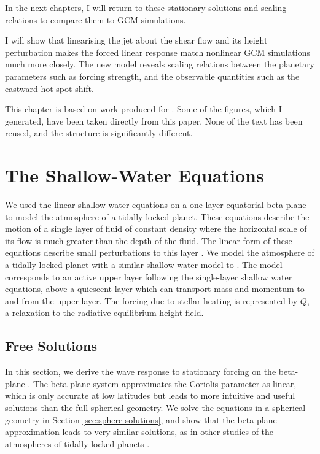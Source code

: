 In the next chapters, I will return to these stationary solutions and scaling relations  to compare them to GCM simulations.



I will show that linearising the jet about the shear flow and its height perturbation makes the forced linear response match nonlinear GCM simulations much more closely. The new model reveals scaling relations between the planetary parameters such as forcing strength, and the observable quantities such as the eastward hot-spot shift.

This chapter is based on work produced for \citet{hammond2018wavemean}. Some of the figures, which I generated, have been taken directly from this paper. None of the text has been reused, and the structure is significantly different.



\section{The Shallow-Water Equations}\label{sec:shallow-water}

We used the linear shallow-water equations on a one-layer equatorial beta-plane to model the atmosphere of a tidally locked planet. These equations describe the motion of a single layer of fluid of constant density where the horizontal scale of its flow is much greater than the depth of the fluid. The linear form of these equations describe small perturbations to this layer \citep{vallis2006book}. We model the atmosphere of a tidally locked planet with a similar shallow-water model to \citet{showman2011superrotation}. The model corresponds to an active upper layer following the single-layer shallow water equations, above a quiescent layer which can transport mass and momentum to and from the upper layer. The forcing due to stellar heating is represented by $Q$, a relaxation to the radiative equilibrium height field.

\subsection{Free Solutions}

In this section, we derive the wave response to stationary forcing on the beta-plane \citep{matsuno1966quasi}. The beta-plane system approximates the Coriolis parameter as linear, which is only accurate at low latitudes but leads to more intuitive and useful solutions than the full spherical geometry. We solve the equations in a spherical geometry in Section \ref{sec:sphere-solutions}, and show that the beta-plane approximation leads to very similar solutions, as in other studies of the atmospheres of tidally locked planets \citep{showman2011superrotation} \citep{heng2014analytical}.

